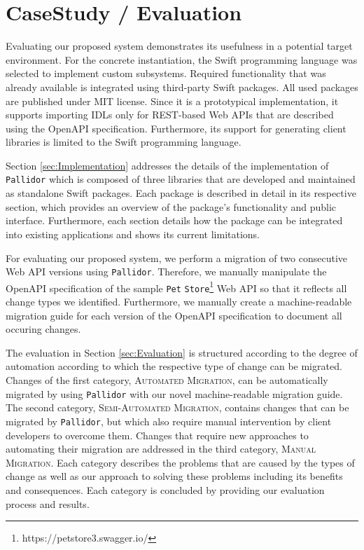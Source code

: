 \chapter{CaseStudy / Evaluation}
\label{ch:CaseStudyEvaluation}

Evaluating our proposed system demonstrates its usefulness in a potential target environment. For the concrete instantiation, the Swift programming language was selected to implement custom subsystems. Required functionality that was already available is integrated using third-party Swift packages. All used packages are published under MIT license. Since it is a prototypical implementation, it supports importing IDLs only for REST-based Web APIs that are described using the OpenAPI specification. Furthermore, its support for generating client libraries is limited to the Swift programming language. 

Section \ref{sec:Implementation} addresses the details of the implementation of \texttt{Pallidor} which is composed of three libraries that are developed and maintained as standalone Swift packages. Each package is described in detail in its respective section, which provides an overview of the package's functionality and public interface. Furthermore, each section details how the package can be integrated into existing applications and shows its current limitations.


For evaluating our proposed system, we perform a migration of two consecutive Web API versions using \texttt{Pallidor}. Therefore, we manually manipulate the OpenAPI specification of the sample \texttt{Pet} \texttt{Store}\footnote{https://petstore3.swagger.io/} Web API so that it reflects all change types we identified. Furthermore, we manually create a machine-readable migration guide for each version of the OpenAPI specification to document all occuring changes. 

The evaluation in Section \ref{sec:Evaluation} is structured according to the degree of automation according to which the respective type of change can be migrated. Changes of the first category, \textsc{Automated Migration}, can be automatically migrated by using \texttt{Pallidor} with our novel machine-readable migration guide. The second category, \textsc{Semi-Automated Migration}, contains changes that can be migrated by \texttt{Pallidor}, but which also require manual intervention by client developers to overcome them. Changes that require new approaches to automating their migration are addressed in the third category, \textsc{Manual Migration}. Each category describes the problems that are caused by the types of change as well as our approach to solving these problems including its benefits and consequences. Each category is concluded by providing our evaluation process and results.

\newpage

\newpage
